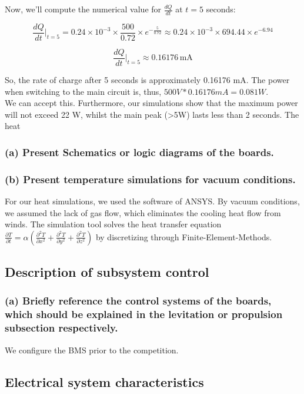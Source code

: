 Now, we'll compute the numerical value for \( \frac{dQ}{dt} \) at \( t = 5 \) seconds:

\[ \frac{dQ}{dt} \Bigg|_{t=5} = 0.24 \times 10^{-3} \times \frac{500}{0.72} \times e^{-\frac{5}{0.72}} \approx 0.24 \times 10^{-3} \times 694.44 \times e^{-6.94} \]

\[ \frac{dQ}{dt} \Bigg|_{t=5} \approx 0.16176 \, \text{mA} \]

So, the rate of charge after 5 seconds is approximately 0.16176 mA.
The power when switching to the main circuit is, thus, \(500V * 0.16176mA = 0.081 W\). \\
We can accept this. Furthermore, our simulations show that the maximum power will not exceed 22 W, whilst the main peak (>5W) lasts 
less than 2 seconds. The heat 

\subsubsection{(a) Present Schematics or logic diagrams of the boards.}
\subsubsection{(b) Present temperature simulations for vacuum conditions.}
For our heat simulations, we used the software of ANSYS. By vacuum conditions, we assumed the
lack of gas flow, which eliminates the cooling heat flow from winds. The simulation tool solves
the heat transfer equation \( \frac{\partial T}{\partial t} = \alpha \left( \frac{\partial^2 T}{\partial x^2} + \frac{\partial^2 T}{\partial y^2} + \frac{\partial^2 T}{\partial z^2} \right) \)
by discretizing through Finite-Element-Methods.

\subsection{Description of subsystem control}
\subsubsection{(a) Briefly reference the control systems of the boards, which should be explained in the levitation or propulsion subsection respectively.}
We configure the BMS prior to the competition. \\


\subsection{Electrical system characteristics}   

